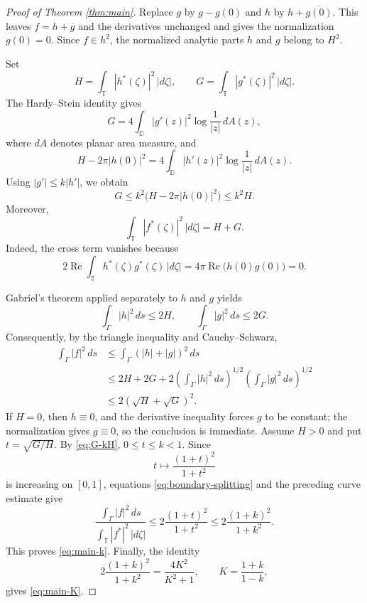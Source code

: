 \documentclass[10pt,a4paper]{amsart}
\newcommand{\D}{\mathbb D}
\newcommand{\T}{\mathbb T}
\newcommand{\ds}{\,ds}
\begin{document}
\begin{proof}[Proof of Theorem \ref{thm:main}]
Replace $g$ by $g-g(0)$ and $h$ by $h+\overline{g(0)}$. This leaves $f=h+\overline g$ and the derivatives unchanged and gives the normalization $g(0)=0$. Since $f\in h^2$, the normalized analytic parts $h$ and $g$ belong to $H^2$.

Set
\[
   H=\int_\T |h^*(\zeta)|^2\,|d\zeta|,
   \qquad
   G=\int_\T |g^*(\zeta)|^2\,|d\zeta|.
\]
The Hardy--Stein identity gives
\[
   G=4\int_\D |g'(z)|^2\log\frac1{|z|}\,dA(z),
\]
where $dA$ denotes planar area measure, and
\[
   H-2\pi |h(0)|^2
   =4\int_\D |h'(z)|^2\log\frac1{|z|}\,dA(z).
\]
Using $|g'|\le k|h'|$, we obtain
\begin{equation}\label{eq:G-kH}
   G\le k^2\bigl(H-2\pi |h(0)|^2\bigr)\le k^2H.
\end{equation}
Moreover,
\begin{equation}\label{eq:boundary-splitting}
   \int_\T |f^*(\zeta)|^2\,|d\zeta|=H+G.
\end{equation}
Indeed, the cross term vanishes because
\[
   2\operatorname{Re}\int_\T h^*(\zeta)g^*(\zeta)\,|d\zeta|
   =4\pi\operatorname{Re}\bigl(h(0)g(0)\bigr)=0.
\]

Gabriel's theorem applied separately to $h$ and $g$ yields
\[
   \int_\Gamma |h|^2\ds\le 2H,
   \qquad
   \int_\Gamma |g|^2\ds\le 2G.
\]
Consequently, by the triangle inequality and Cauchy--Schwarz,
\begin{align*}
   \int_\Gamma |f|^2\ds
   &\le \int_\Gamma (|h|+|g|)^2\ds \\
   &\le 2H+2G
      +2\left(\int_\Gamma |h|^2\ds\right)^{1/2}
        \left(\int_\Gamma |g|^2\ds\right)^{1/2} \\
   &\le 2(\sqrt H+\sqrt G)^2.
\end{align*}
If $H=0$, then $h\equiv0$, and the derivative inequality forces $g$ to be constant; the normalization gives $g\equiv0$, so the conclusion is immediate. Assume $H>0$ and put $t=\sqrt{G/H}$. By \eqref{eq:G-kH}, $0\le t\le k<1$. Since
\[
   t\longmapsto \frac{(1+t)^2}{1+t^2}
\]
is increasing on $[0,1]$, equations \eqref{eq:boundary-splitting} and the preceding curve estimate give
\[
   \frac{\displaystyle\int_\Gamma |f|^2\ds}
        {\displaystyle\int_\T |f^*|^2\,|d\zeta|}
   \le 2\frac{(1+t)^2}{1+t^2}
   \le 2\frac{(1+k)^2}{1+k^2}.
\]
This proves \eqref{eq:main-k}. Finally, the identity
\[
   2\frac{(1+k)^2}{1+k^2}
   =\frac{4K^2}{K^2+1},
   \qquad K=\frac{1+k}{1-k},
\]
gives \eqref{eq:main-K}.
\end{proof}
\end{document}
